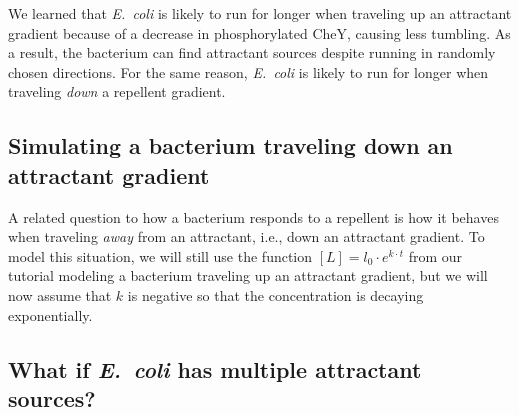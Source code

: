 We learned that \textit{E.~coli} is likely to run for longer when traveling up an attractant gradient because of a decrease in phosphorylated CheY, causing less tumbling. As a result, the bacterium can find attractant sources despite running in randomly chosen directions. For the same reason, \textit{E.~coli} is likely to run for longer when traveling \textit{down} a repellent gradient.\\

\begin{exercise}\end{exercise}

\subsection{Simulating a bacterium traveling down an attractant gradient}

A related question to how a bacterium responds to a repellent is how it behaves when traveling \textit{away} from an attractant, i.e., down an attractant gradient. To model this situation, we will still use the function $[L] = l_0 \cdot e^{k \cdot t}$ from our tutorial modeling a bacterium traveling up an attractant gradient, but we will now assume that $k$ is negative so that the concentration is decaying exponentially.\\

\begin{exercise}\end{exercise}

\subsection{What if \textit{E.~coli} has multiple attractant sources?}

